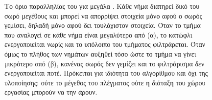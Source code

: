 \begin{figure}[H]
\begin{tikzpicture}[x=1.0cm, y=1.0cm]
    \end{tikzpicture}
    \caption{Το όριο παραλληλίας του  για μεγάλα . Κάθε νήμα
    διατηρεί δικό του σωρό μεγέθους  και μπορεί να απορρίψει στοιχεία μόνο
    αφού ο σωρός γεμίσει, δηλαδή μόνο αφού δει τουλάχιστον  στοιχεία. Όταν
    το τμήμα που αναλογεί σε κάθε νήμα είναι μεγαλύτερο από  (α), το κατώφλι
    ενεργοποιείται νωρίς και το υπόλοιπο του τμήματος φιλτράρεται. Όταν όμως το
    πλήθος των νημάτων αυξηθεί τόσο ώστε το τμήμα να γίνει μικρότερο από 
    (β), κανένας σωρός δεν γεμίζει και το φιλτράρισμα δεν ενεργοποιείται ποτέ.
    Πρόκειται για ιδιότητα του αλγορίθμου και όχι της υλοποίησης: ούτε το μέγεθος
    του πλέγματος ούτε η διάταξη του χώρου εργασίας μπορούν να την άρουν.}
    \label{fig:gpu-mapreduce-limit}
\end{figure}
